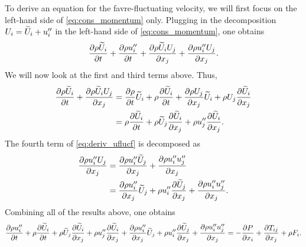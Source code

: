 \documentclass[oneside,a4paper,11pt]{report}
\begin{document}
To derive an equation for the favre-fluctuating velocity, we will first focus on the left-hand side of \cref{eq:cons_momentum} only. Plugging in the decomposition $U_i = \widetilde{U}_i + u_i''$ in the left-hand side of \cref{eq:cons_momentum}, one obtains
\begin{equation}
\label{eq:deriv_uflucf}
    \frac{\partial \rho \widetilde{U}_i}{\partial t}  + \frac{\partial \rho u_i''}{\partial t} + \frac{ \partial \rho \widetilde{U}_i U_j}{\partial x_j} + \frac{\partial \rho u_i'' U_j}{\partial x_j}.
\end{equation}
We will now look at the first and third terms above. Thus,
\begin{align}
    \frac{\partial \rho \widetilde{U}_i}{\partial t} + \frac{ \partial \rho \widetilde{U}_i U_j}{\partial x_j} &= \frac{\partial \rho}{\partial t} \widetilde{U}_i + \rho \frac{\partial \widetilde{U}_i}{\partial t} + \frac{\partial \rho U_j}{\partial x_j} \widetilde{U}_i + \rho U_j \frac{\partial \widetilde{U}_i}{\partial x_j} \nonumber \\
    &= \rho \frac{\partial \widetilde{U}_i}{\partial t} + \rho \widetilde{U}_j \frac{\partial \widetilde{U}_i}{\partial x_j} + \rho u_j'' \frac{\partial \widetilde{U}_i}{\partial x_j}.
\end{align}
The fourth term of \cref{eq:deriv_uflucf} is decomposed as
\begin{align}
    \frac{\partial \rho u_i'' U_j}{\partial x_j} &= \frac{\partial \rho u_i'' \widetilde{U}_j}{\partial x_j} + \frac{\partial \rho u_i'' u_j''}{\partial x_j} \nonumber \\
    &= \frac{\partial \rho u_i''}{\partial x_j} \widetilde{U}_j + \rho u_i'' \frac{\partial \widetilde{U}_j}{\partial x_j} + \frac{\partial \rho u_i'' u_j''}{\partial x_j}.
\end{align}
Combining all of the results above, one obtains
\begin{equation}
\label{eq:vel_fluc_favre}
    \frac{\partial \rho u_i''}{\partial t} + \rho \frac{\partial \widetilde{U}_i}{\partial t} + \rho \widetilde{U}_j \frac{\partial \widetilde{U}_i}{\partial x_j} + \rho u_j'' \frac{\partial \widetilde{U}_i}{\partial x_j} + \frac{\partial \rho u_i''}{\partial x_j} \widetilde{U}_j + \rho u_i'' \frac{\partial \widetilde{U}_j}{\partial x_j} + \frac{\partial \rho u_i'' u_j''}{\partial x_j} = -\frac{\partial P}{\partial x_i} + \frac{\partial T_{ij}}{\partial x_j} + \rho F_i.
\end{equation}

\end{document}
